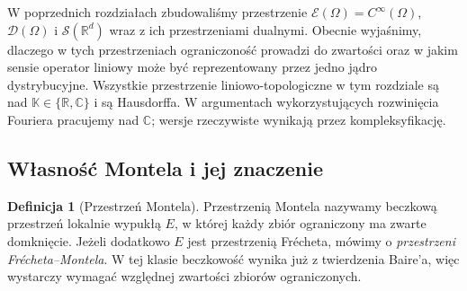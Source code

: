 \documentclass[11pt,a4paper]{article}
\numberwithin{equation}{section}
\theoremstyle{plain}
\theoremstyle{definition}
\newtheorem{definicja}[twierdzenie]{Definicja}
\theoremstyle{remark}
\newcommand{\R}{\mathbb R}
\newcommand{\C}{\mathbb C}
\newcommand{\K}{\mathbb K}
\begin{document}
W poprzednich rozdziałach zbudowaliśmy przestrzenie
$\mathcal E(\Omega)=C^\infty(\Omega)$,
$\mathcal D(\Omega)$ i $\mathcal S(\R^d)$ wraz z ich
przestrzeniami dualnymi. Obecnie wyjaśnimy, dlaczego w tych
przestrzeniach ograniczoność prowadzi do zwartości oraz w jakim
sensie operator liniowy może być reprezentowany przez jedno jądro
dystrybucyjne. Wszystkie przestrzenie liniowo-topologiczne w tym
rozdziale są nad $\K\in\{\R,\C\}$ i są Hausdorffa. W argumentach
wykorzystujących rozwinięcia Fouriera pracujemy nad $\C$;
wersje rzeczywiste wynikają przez kompleksyfikację.

\subsection{Własność Montela i jej znaczenie}

\begin{definicja}[Przestrzeń Montela]
\label{def:montel23}
Przestrzenią Montela nazywamy beczkową przestrzeń lokalnie wypukłą
$E$, w której każdy zbiór ograniczony ma zwarte domknięcie.
Jeżeli dodatkowo $E$ jest przestrzenią Frécheta, mówimy o
\emph{przestrzeni Frécheta--Montela}. W tej klasie beczkowość
wynika już z twierdzenia Baire'a, więc wystarczy wymagać
względnej zwartości zbiorów ograniczonych.
\end{definicja}
\end{document}
